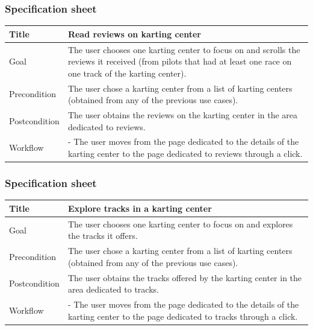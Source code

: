 \documentclass{beamer}
\begin{document}
\begin{frame}
    \frametitle{Specification sheet}
    \begin{table}
        \tiny
        \begin{tabular}{|p{2cm}|p{6cm}|}
        \hline
        Title & \textbf{Read reviews on karting center} \\
        \hline
        Goal & The user chooses one karting center to focus on and scrolls the reviews it received (from pilots
        that had at least one race on one track of the karting center). \\
        \hline
        Precondition & The user chose a karting center from a list of karting centers (obtained from any of the previous use cases).\\
        \hline
        Postcondition & The user obtains the reviews on the karting center in the area dedicated to reviews. \\
        \hline
        Workflow &
        - The user moves from the page dedicated to the details of the karting center to the
        page dedicated to reviews through a click. \\
        \hline
        \end{tabular}
\end{table}
\end{frame}

\begin{frame}
    \frametitle{Specification sheet}
    \begin{table}
        \tiny
        \begin{tabular}{|p{2cm}|p{6cm}|}
        \hline
        Title & \textbf{Explore tracks in a karting center} \\
        \hline
        Goal & The user chooses one karting center to focus on and explores the tracks it offers. \\
        \hline
        Precondition & The user chose a karting center from a list of karting centers (obtained from any of the previous use cases).\\
        \hline
        Postcondition & The user obtains the tracks offered by the karting center in the area dedicated to tracks. \\
        \hline
        Workflow &
        - The user moves from the page dedicated to the details of the karting center to the
        page dedicated to tracks through a click. \\
        \hline
        \end{tabular}
\end{table}
\end{frame}
\end{document}
